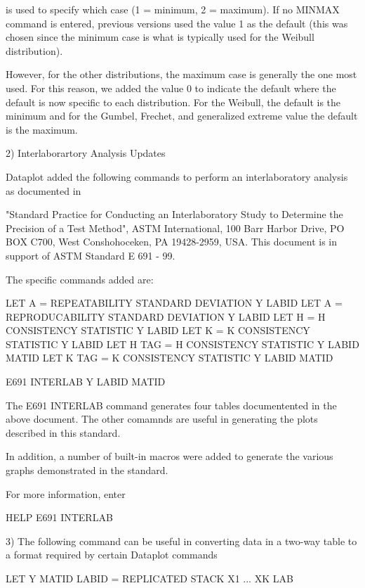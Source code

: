 {       is used to specify which case (1 = minimum, 2 = maximum).
       If no MINMAX command is entered, previous versions used
       the value 1 as the default (this was chosen since the
       minimum case is what is typically used for the Weibull
       distribution).

       However, for the other distributions, the maximum case
       is generally the one most used.  For this reason, we
       added the value 0 to indicate the default where the default
       is now specific to each distribution.  For the Weibull, the
       default is the minimum and for the Gumbel, Frechet,  and
       generalized extreme value the default is the maximum.

 2) Interlaborartory Analysis Updates

    Dataplot added the following commands to perform an
    interlaboratory analysis as documented in 

      "Standard Practice for Conducting an Interlaboratory Study
      to Determine the Precision of a Test Method", ASTM
      International, 100 Barr Harbor Drive, PO BOX C700,
      West Conshohoceken, PA 19428-2959, USA.  This document is
      in support of ASTM Standard E 691 - 99.

    The specific commands added are:

       LET A = REPEATABILITY STANDARD DEVIATION Y LABID
       LET A = REPRODUCABILITY STANDARD DEVIATION Y LABID
       LET H = H CONSISTENCY STATISTIC Y LABID
       LET K = K CONSISTENCY STATISTIC Y LABID
       LET H TAG = H CONSISTENCY STATISTIC Y LABID MATID
       LET K TAG = K CONSISTENCY STATISTIC Y LABID MATID

       E691 INTERLAB  Y LABID MATID

    The E691 INTERLAB command generates four tables documentented
    in the above document.  The other comamnds are useful in
    generating the plots described in this standard.

    In addition, a number of built-in macros were added to
    generate the various graphs demonstrated in the standard.

    For more information, enter

       HELP E691 INTERLAB

 3) The following command can be useful in converting data in a
    two-way table to a format required by certain Dataplot
    commands

       LET Y MATID LABID = REPLICATED STACK X1 ... XK LAB

}
